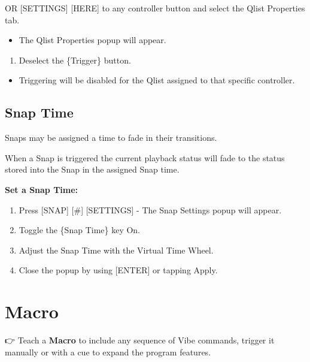 \documentclass[
]{article}
\providecommand{\tightlist}{%
  \setlength{\itemsep}{0pt}\setlength{\parskip}{0pt}}
\begin{document}
OR {[}SETTINGS{]} {[}HERE{]} to any controller button and select the Qlist Properties tab.

\begin{itemize}
\tightlist
\item
  The Qlist Properties popup will appear.
\end{itemize}

\begin{enumerate}
\def\labelenumi{\arabic{enumi}.}
\setcounter{enumi}{1}
\tightlist
\item
  Deselect the \{Trigger\} button.
\end{enumerate}

\begin{itemize}
\tightlist
\item
  Triggering will be disabled for the Qlist assigned to that specific controller.
\end{itemize}

\hypertarget{Snap-Time-12.4}{%
\subsection{Snap Time}\label{Snap-Time-12.4}}

Snaps may be assigned a time to fade in their transitions.

When a Snap is triggered the current playback status will fade to the status stored into the Snap in the assigned Snap time.

\textbf{Set a Snap Time:}

\begin{enumerate}
\def\labelenumi{\arabic{enumi}.}
\item
  Press {[}SNAP{]} {[}\#{]} {[}SETTINGS{]} - The Snap Settings popup will appear.
\item
  Toggle the \{Snap Time\} key On.
\item
  Adjust the Snap Time with the Virtual Time Wheel.
\item
  Close the popup by using {[}ENTER{]} or tapping Apply.
\end{enumerate}

\hypertarget{macro}{%
\section{Macro}\label{macro}}

👉 Teach a \textbf{Macro} to include any sequence of Vibe commands, trigger it manually or with a cue to expand the program features.
\end{document}
